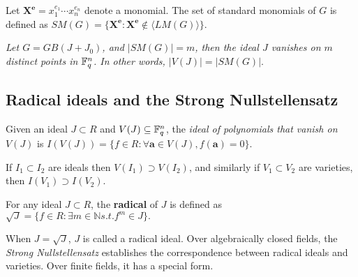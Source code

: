 \begin{Definition}
Let $\bm{X^e} = x_1^{e_1}\cdots x_n^{e_n}$ denote a monomial. The set
of standard monomials of $G$ is defined as 
$ SM(G) = \{\bm{X^e} : \bm{X^e} \notin \langle LM(G) \rangle\}.$
\end{Definition}

\begin{Theorem} 
\label{thm:count}
{\it
Let $G = GB(J+J_0)$, and $|SM(G)| = m$, then the ideal $J$ vanishes on
$m$ distinct points in ${\mathbb{F}}_{q}^n$. In other words, $|V(J)| = |SM(G)|.$
}
\end{Theorem}



%

\subsection{Radical ideals and the Strong Nullstellensatz} 
\begin{Definition}
Given an ideal $J\subset R$ and $V(J) \subseteq {\mathbb{F}}_{q}^n$, the {\it ideal
of polynomials that vanish on} $V(J)$ is $I(V(J)) = \{ f \in R :
\forall \bm{a} \in V(J), f(\bm{a}) = 0\}$.
\end{Definition}

If $I_1 \subset I_2$ are ideals then $V(I_1) \supset V(I_2)$, and
similarly if $V_1 \subset V_2$ are varieties, then $I(V_1) \supset
I(V_2)$. 

\begin{Definition}
For any ideal $J\subset R$, the {\bf radical} of $J$ is defined
as $\sqrt{J} = \{f \in R: \exists m \in \mathbb{N} s.t. f^m \in J\}.$
\end{Definition}

When $J = \sqrt{J}$, $J$ is called a radical ideal. Over algebraically
closed fields, the {\it Strong Nullstellensatz} establishes the
correspondence between radical ideals and varieties. Over finite
fields, it has a special form. 


